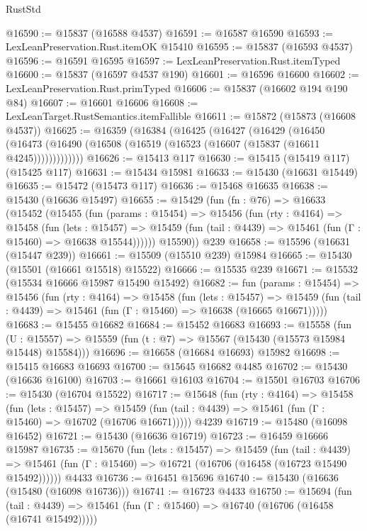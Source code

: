 \begin{lexlean}{RustStd}
\begin{coremodule}
@16590 := @15837 (@16588 @4537)
@16591 := @16587 @16590
@16593 := LexLeanPreservation.Rust.itemOK @15410
@16595 := @15837 (@16593 @4537)
@16596 := @16591 @16595
@16597 := LexLeanPreservation.Rust.itemTyped
@16600 := @15837 (@16597 @4537 @190)
@16601 := @16596 @16600
@16602 := LexLeanPreservation.Rust.primTyped
@16606 := @15837 (@16602 @194 @190 @84)
@16607 := @16601 @16606
@16608 := LexLeanTarget.RustSemantics.itemFallible
@16611 := @15872 (@15873 (@16608 @4537))
@16625 := @16359
    (@16384
      (@16425
        (@16427
          (@16429
            (@16450
              (@16473 (@16490 (@16508 (@16519 (@16523 (@16607 (@15837 (@16611 @4245)))))))))))))
@16626 := @15413 @117
@16630 := @15415 (@15419 @117) (@15425 @117)
@16631 := @15434 @15981
@16633 := @15430 (@16631 @15449)
@16635 := @15472 (@15473 @117)
@16636 := @15468 @16635
@16638 := @15430 (@16636 @15497)
@16655 := @15429
    (fun (fn : @76) =>
    @16633
      (@15452
        (@15455
          (fun (params : @15454) =>
          @15456
            (fun (rty : @4164) =>
            @15458
              (fun (lets : @15457) =>
              @15459 (fun (tail : @4439) => @15461 (fun (Γ : @15460) => @16638 @15544))))))
        @15590))
    @239
@16658 := @15596 (@16631 (@15447 @239))
@16661 := @15509 (@15510 @239) @15984
@16665 := @15430 (@15501 (@16661 @15518) @15522)
@16666 := @15535 @239
@16671 := @15532 (@15534 @16666 @15987 @15490 @15492)
@16682 := fun (params : @15454) =>
  @15456
    (fun (rty : @4164) =>
    @15458
      (fun (lets : @15457) =>
      @15459 (fun (tail : @4439) => @15461 (fun (Γ : @15460) => @16638 (@16665 @16671)))))
@16683 := @15455 @16682
@16684 := @15452 @16683
@16693 := @15558
    (fun (U : @15557) => @15559 (fun (t : @7) => @15567 (@15430 (@15573 @15984 @15448) @15584)))
@16696 := @16658 (@16684 @16693) @15982
@16698 := @15415 @16683 @16693
@16700 := @15645 @16682 @4485
@16702 := @15430 (@16636 @16100)
@16703 := @16661 @16103
@16704 := @15501 @16703
@16706 := @15430 (@16704 @15522)
@16717 := @15648
    (fun (rty : @4164) =>
    @15458
      (fun (lets : @15457) =>
      @15459 (fun (tail : @4439) => @15461 (fun (Γ : @15460) => @16702 (@16706 @16671)))))
    @4239
@16719 := @15480 (@16098 @16452)
@16721 := @15430 (@16636 @16719)
@16723 := @16459 @16666 @15987
@16735 := @15670
    (fun (lets : @15457) =>
    @15459
      (fun (tail : @4439) =>
      @15461 (fun (Γ : @15460) => @16721 (@16706 (@16458 (@16723 @15490 @15492))))))
    @4433
@16736 := @16451 @15696
@16740 := @15430 (@16636 (@15480 (@16098 @16736)))
@16741 := @16723 @4433
@16750 := @15694
    (fun (tail : @4439) => @15461 (fun (Γ : @15460) => @16740 (@16706 (@16458 (@16741 @15492)))))

\end{coremodule}
\end{lexlean}
